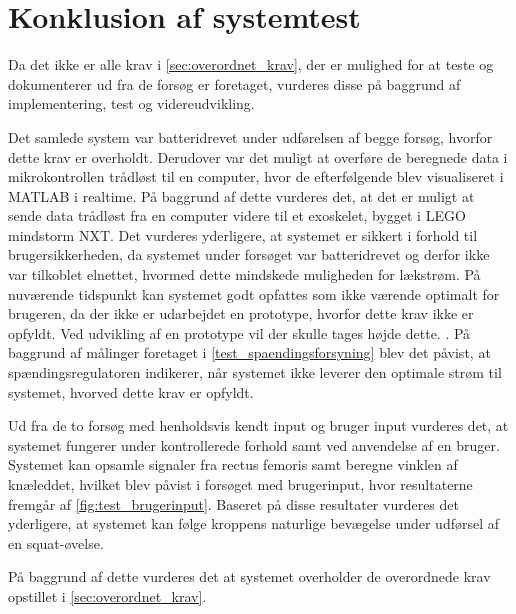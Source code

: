 \section{Konklusion af systemtest}
Da det ikke er alle krav i \autoref{sec:overordnet_krav}, der er mulighed for at teste og dokumenterer ud fra de forsøg er foretaget, vurderes disse på baggrund af implementering, test og videreudvikling. 

Det samlede system var batteridrevet under udførelsen af begge forsøg, hvorfor dette krav er overholdt. Derudover var det muligt at overføre de beregnede data i mikrokontrollen trådløst til en computer, hvor de efterfølgende blev visualiseret i MATLAB i realtime. På baggrund af dette vurderes det, at det er muligt at sende data trådløst fra en computer videre til et exoskelet, bygget i LEGO mindstorm NXT. Det vurderes yderligere, at systemet er sikkert i forhold til brugersikkerheden, da systemet under forsøget var batteridrevet og derfor ikke var tilkoblet elnettet, hvormed dette mindskede muligheden for lækstrøm. 
På nuværende tidspunkt kan systemet godt opfattes som ikke værende optimalt for brugeren, da der ikke er udarbejdet en prototype, hvorfor dette krav ikke er opfyldt. Ved udvikling af en prototype vil der skulle tages højde dette. . 
På baggrund af målinger foretaget i \autoref{test_spaendingsforsyning} blev det påvist, at spændingsregulatoren indikerer, når systemet ikke leverer den optimale strøm til systemet, hvorved dette krav er opfyldt. 

Ud fra de to forsøg med henholdsvis kendt input og bruger input vurderes det, at systemet fungerer under kontrollerede forhold samt ved anvendelse af en bruger. Systemet kan opsamle signaler fra rectus femoris samt beregne vinklen af knæleddet, hvilket blev påvist i forsøget med brugerinput, hvor resultaterne fremgår af \autoref{fig:test_brugerinput}. Baseret på disse resultater vurderes det yderligere, at systemet kan følge kroppens naturlige bevægelse under udførsel af en squat-øvelse. 

På baggrund af dette vurderes det at systemet overholder de overordnede krav opstillet i \autoref{sec:overordnet_krav}. 

